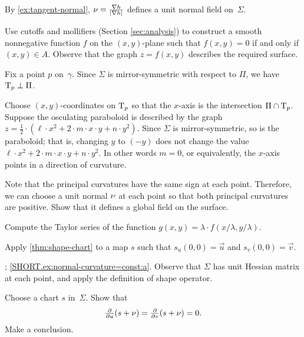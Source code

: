 \begin{multicols}{2}
By \ref{ex:tangent-normal}, $\nu=\tfrac{\nabla h}{|\nabla h|}$ defines a unit normal field on~$\Sigma$.

Use cutoffs and mollifiers (Section \ref{sec:analysis}) to construct a smooth nonnegative function $f$ on the $(x,y)$-plane such that $f(x,y)=0$ if and only if $(x,y)\in A$.
Observe that the graph $z=f(x,y)$ describes the required surface.


\setcounter{eqtn}{0}

Fix a point $p$ on~$\gamma$.
Since $\Sigma$ is mirror-symmetric with respect to $\Pi$,
we have $\mathrm{T}_p\perp \Pi$.

Choose $(x,y)$-coordinates on $\mathrm{T}_p$ so that the $x$-axis is the intersection $\Pi\cap \mathrm{T}_p$.
Suppose the osculating paraboloid is described by the graph 
$z=\tfrac12\cdot(\ell\cdot x^2+2\cdot m\cdot x\cdot y+n\cdot y^2)$.
Since $\Sigma$ is mirror-symmetric, so is the paraboloid;
that is, changing $y$ to $(-y)$ does not change the value 
$\ell\cdot x^2+2\cdot m\cdot x\cdot y+n\cdot y^2$.
In other words $m=0$, or equivalently, the $x$-axis points in a direction of curvature.

 Note that the principal curvatures have the same sign at each point.
Therefore, we can choose a unit normal $\nu$ at each point so that both principal curvatures are positive.
Show that it defines a global field on the surface.


 Compute the Taylor series of the function $g(x,y)= \lambda \cdot f( x/ \lambda , y/\lambda)$.


Apply \ref{thm:shape-chart} to a map $s$ such that $s_u(0,0)=\vec u$ and $s_v(0,0)=\vec v$.

\parbf{\ref{ex:normal-curvature=const}}; \ref{SHORT.ex:normal-curvature=const:a}.
Observe that $\Sigma$ has unit Hessian matrix at each point, and apply the definition of shape operator.

Choose a chart $s$ in~$\Sigma$.
Show that
\[\tfrac{\partial }{\partial u}(s+\nu)
=
\tfrac{\partial }{\partial v}(s+\nu)
=
0.\]
Make a conclusion.


\end{multicols}
